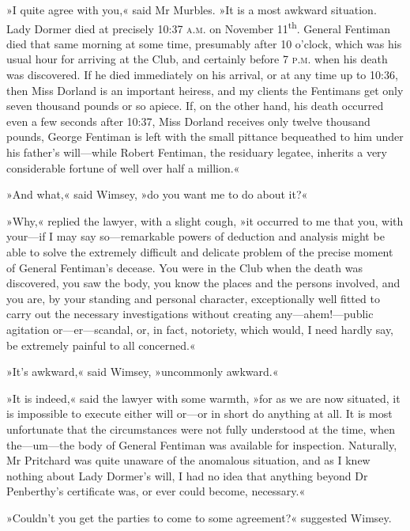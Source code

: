 »I quite agree with you,« said Mr Murbles. »It is a most awkward situation. Lady Dormer died at precisely 10:37 \textsc{a.m.} on November  11\textsuperscript{th}. General Fentiman died that same morning at some time, presumably after 10 o'clock, which was his usual hour for arriving at the Club, and certainly before 7 \textsc{p.m.} when his death was discovered. If he died immediately on his arrival, or at any time up to 10:36, then Miss Dorland is an important heiress, and my clients the Fentimans get only seven thousand pounds or so apiece. If, on the other hand, his death occurred even a few seconds after 10:37, Miss Dorland receives only twelve thousand pounds, George Fentiman is left with the small pittance bequeathed to him under his father's will\allowbreak---\allowbreak while Robert Fentiman, the residuary legatee, inherits a very considerable fortune of well over half a million.«

»And what,« said Wimsey, »do you want me to do about it?«

»Why,« replied the lawyer, with a slight cough, »it occurred to me that you, with your\allowbreak---\allowbreak if I may say so\allowbreak---\allowbreak remarkable powers of deduction and analysis might be able to solve the extremely difficult and delicate problem of the precise moment of General Fentiman's decease. You were in the Club when the death was discovered, you saw the body, you know the places and the persons involved, and you are, by your standing and personal character, exceptionally well fitted to carry out the necessary investigations without creating any\allowbreak---\allowbreak ahem!---public agitation or\allowbreak---\allowbreak er---scandal, or, in fact, notoriety, which would, I need hardly say, be extremely painful to all concerned.«

»It's awkward,« said Wimsey, »uncommonly awkward.«

»It is indeed,« said the lawyer with some warmth, »for as we are now situated, it is impossible to execute either will or\allowbreak---\allowbreak or in short do anything at all. It is most unfortunate that the circumstances were not fully understood at the time, when the\allowbreak---\allowbreak um---the body of General Fentiman was available for inspection. Naturally, Mr Pritchard was quite unaware of the anomalous situation, and as I knew nothing about Lady Dormer's will, I had no idea that anything beyond Dr Penberthy's certificate was, or ever could become, necessary.«

»Couldn't you get the parties to come to some agreement?« suggested Wimsey.

